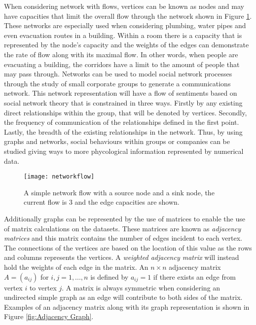 When considering network with flows, vertices can be known as nodes and may have capacities that limit the overall flow through the network shown in Figure \ref{fig:Network Flow}. These networks are especially used when considering plumbing, water pipes and even evacuation routes in a building. Within a room there is a capacity that is represented by the node's capacity and the weights of the edges can demonstrate the rate of flow along with its maximal flow. In other words, when people are evacuating a building, the corridors have a limit to the amount of people that may pass through. Networks can be used to model social network processes through the study of small corporate groups to generate a communications network. This network representation will have a flow of sentiments based on social network theory \cite{ZACHARY1984259} that is constrained in three ways. Firstly by any existing direct relationships within the group, that will be denoted by vertices. Secondly, the frequency of communication of the relationships defined in the first point. Lastly, the breadth of the existing relationships in the network. Thus, by using graphs and networks, social behaviours within groups or companies can be studied giving ways to more phycological information represented by numerical data.

\begin{figure}[!htb]
\centering
\texttt{[image: networkflow]}
\caption{A simple network flow with a source node and a sink node, the current flow is 3 and the edge capacities are shown.}
\label{fig:Network Flow}
\end{figure}

Additionally graphs can be represented by the use of matrices to enable the use of matrix calculations on the datasets. These matrices are known as \emph{adjacency matrices} \cite{KnauerU.2011Agt:} and this matrix contains the number of edges incident to each vertex. The connections of the vertices are based on the location of this value as the rows and columns represents the vertices. A \emph{weighted adjacency matrix} will instead hold the weights of each edge in the matrix. An $n \times n$ adjacency matrix $A = (a_{ij})$ for $ i, j = 1, ..., n$ is defined by $a_{ij} = 1$ if there exists an edge from vertex $i$ to vertex $j$. A matrix is always symmetric when considering an undirected simple graph as an edge will contribute to both sides of the matrix. Examples of an adjacency matrix along with its graph representation is shown in Figure \ref{fig:Adjacency Graph}.
\newline

